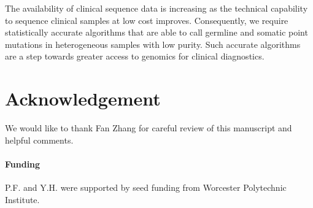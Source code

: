 \documentclass{bioinfo}
\begin{document}
The availability of clinical sequence data is increasing as the technical capability to sequence clinical samples at low cost improves. Consequently, we require statistically accurate algorithms that are able to call germline and somatic point mutations in heterogeneous samples with low purity. Such accurate algorithms are a step towards greater access to genomics for clinical diagnostics.

\section*{Acknowledgement}
We would like to thank Fan Zhang for careful review of this manuscript and helpful comments.

\paragraph{Funding\textcolon}  P.F. and Y.H. were supported by seed funding from Worcester Polytechnic Institute.



\end{document}
